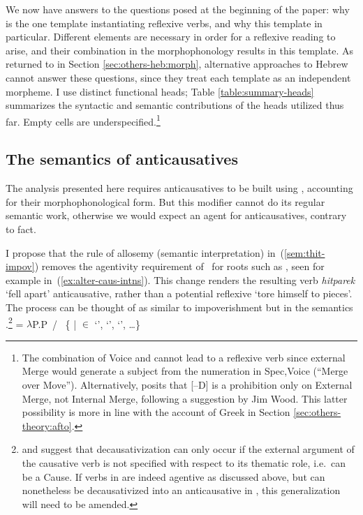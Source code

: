 We now have answers to the questions posed at the beginning of the paper: why {\thit} is the one template instantiating reflexive verbs, and why this template in particular. Different elements are necessary in order for a reflexive reading to arise, and their combination in the morphophonology results in this template. As returned to in Section \ref{sec:others-heb:morph}, alternative approaches to Hebrew cannot answer these questions, since they treat each template as an independent morpheme. I use distinct functional heads; Table \ref{table:summary-heads} summarizes the syntactic and semantic contributions of the heads utilized thus far.  Empty cells are underspecified.\footnote{The combination of Voice and {\va} cannot lead to a reflexive verb since external Merge would generate a subject from the numeration in Spec,Voice (``Merge over Move''). Alternatively, \cite{oseki17nyu} posits that [--D] is a prohibition only on External Merge, not Internal Merge, following a suggestion by Jim Wood. This latter possibility is more in line with the account of Greek in Section \ref{sec:others-theory:afto}.}


	\subsection{The semantics of anticausatives} \label{sec:refl:anticaus}
The analysis presented here requires {\thit} anticausatives to be built using {\va}, accounting for their morphophonological form. But this modifier cannot do its regular semantic work, otherwise we would expect an agent for anticausatives, contrary to fact.

I propose that the rule of allosemy (semantic interpretation) in~(\ref{sem:thit-impov}) removes the agentivity requirement of {\va}~for roots such as , seen for example in~(\ref{ex:alter-caus-intns}). This change renders the resulting verb \emph{hitparek} `fell apart' anticausative, rather than a potential reflexive `tore himself to pieces'. The process can be thought of as similar to impoverishment \citep{bonet91,noyer98} but in the semantics \citep{nevins15roots}.\footnote{\cite{unaccusativity95} and \cite{reinhart02} suggest that decausativization can only occur if the external argument of the causative verb is not specified with respect to its thematic role, i.e.~can be a Cause. If verbs in {\tpie} are indeed agentive as discussed above, but can nonetheless be decausativized into an anticausative in {\thit}, this generalization will need to be amended.}
\ex\label{sem:thit-impov}\denote{\va~\!} = $\lambda$P.P~/ {\vz} \trace~\{ | 
	  $\in$  `',  `',  `', \dots\}
\xe

